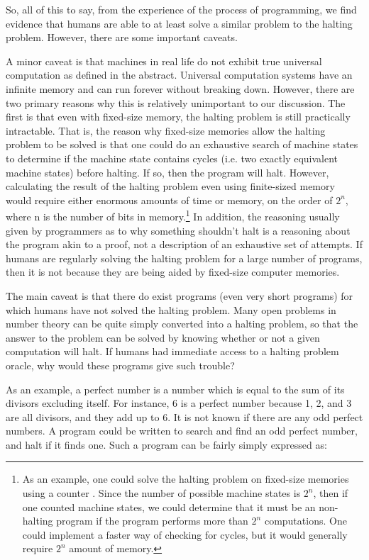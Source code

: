 So, all of this to say, from the experience of the process of programming, we find evidence that humans are able to at least solve a similar problem to the halting problem.  However, there are some important caveats.

A minor caveat is that machines in real life do not exhibit true universal computation as defined in the abstract.  Universal computation systems have an infinite memory and can run forever without breaking down.  However, there are two primary reasons why this is relatively unimportant to our discussion.  The first is that even with fixed-size memory, the halting problem is still practically intractable.  That is, the reason why fixed-size memories allow the halting problem to be solved is that one could do an exhaustive search of machine states to determine if the machine state contains cycles (i.e. two exactly equivalent machine states) before halting.  If so, then the program will halt.  However, calculating the result of the halting problem even using finite-sized memory would require either enormous amounts of time or memory, on the order of $2^n$, where n is the number of bits in memory.\footnote{As an example, one could solve the halting problem on fixed-size memories using a counter \citep{gurari1989}.  Since the number of possible machine states is $2^n$, then if one counted machine states, we could determine that it must be an non-halting program if the program performs more than $2^n$ computations.  One could implement a faster way of checking for cycles, but it would generally require $2^n$ amount of memory.}  In addition, the reasoning usually given by programmers as to why something shouldn't halt is a reasoning about the program akin to a proof, not a description of an exhaustive set of attempts.  If humans are regularly solving the halting problem for a large number of programs, then it is not because they are being aided by fixed-size computer memories.

The main caveat is that there do exist programs (even very short programs) for which humans have not solved the halting problem.  Many open problems in number theory can be quite simply converted into a halting problem, so that the answer to the problem can be solved by knowing whether or not a given computation will halt.  If humans had immediate access to a halting problem oracle, why would these programs give such trouble?

As an example, a perfect number is a number which is equal to the sum of its divisors excluding itself.  For instance, 6 is a perfect number because 1, 2, and 3 are all divisors, and they add up to 6.  It is not known if there are any odd perfect numbers.  A program could be written to search and find an odd perfect number, and halt if it finds one.  Such a program can be fairly simply expressed as:

